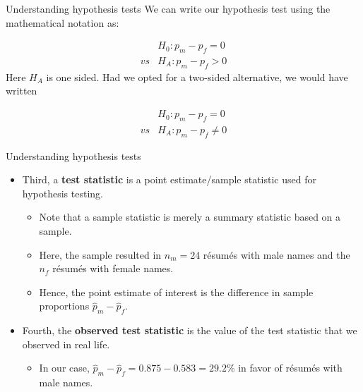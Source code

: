 \documentclass[
  ignorenonframetext,
]{beamer}
\providecommand{\tightlist}{%
  \setlength{\itemsep}{0pt}\setlength{\parskip}{0pt}}
\begin{document}
\begin{frame}{Understanding hypothesis tests}
\protect\hypertarget{understanding-hypothesis-tests-4}{}
We can write our hypothesis test using the mathematical notation as:

\[\begin{array}{ll}
&H_0: p_m-p_f=0\\
vs&H_A: p_m-p_f>0
\end{array}\] Here \(H_A\) is one sided. Had we opted for a two-sided
alternative, we would have written

\[\begin{array}{ll}
&H_0: p_m-p_f=0\\
vs&H_A: p_m-p_f\neq 0
\end{array}\]
\end{frame}

\begin{frame}{Understanding hypothesis tests}
\protect\hypertarget{understanding-hypothesis-tests-5}{}
\begin{itemize}
\item
  Third, a \textbf{test statistic} is a point estimate/sample statistic
  used for hypothesis testing.

  \begin{itemize}
  \tightlist
  \item
    Note that a sample statistic is merely a summary statistic based on
    a sample.
  \item
    Here, the sample resulted in \(n_m=24\) résumés with male names and
    the \(n_f\) résumés with female names.
  \item
    Hence, the point estimate of interest is the difference in sample
    proportions \(\hat{p}_m-\hat{p}_f\).
  \end{itemize}
\item
  Fourth, the \textbf{observed test statistic} is the value of the test
  statistic that we observed in real life.

  \begin{itemize}
  \tightlist
  \item
    In our case, \(\hat{p}_m-\hat{p}_f=0.875-0.583=29.2\%\) in favor of
    résumés with male names.
  \end{itemize}
\end{itemize}
\end{frame}
\end{document}
